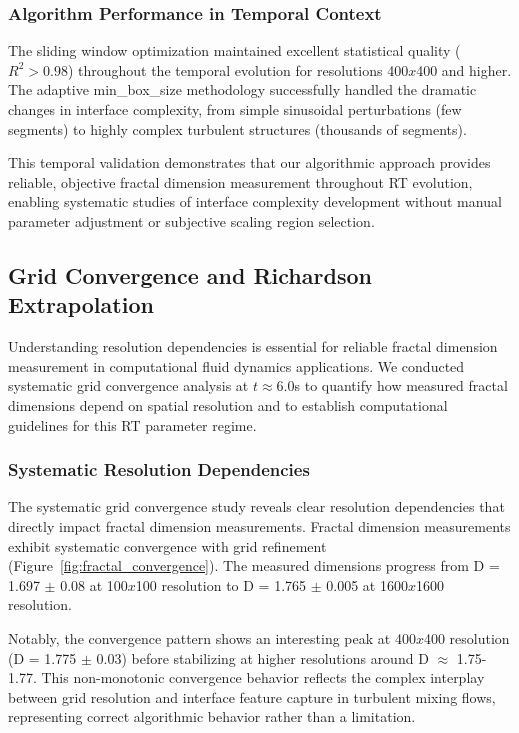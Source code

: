 \documentclass[preprint,12pt]{elsarticle}
\def\times{x}%
\begin{document}
\subsubsection{Algorithm Performance in Temporal Context}

The sliding window optimization maintained excellent statistical quality ($R^2 > 0.98$) throughout the temporal evolution for resolutions 400$\times$400 and higher. The adaptive min\_box\_size methodology successfully handled the dramatic changes in interface complexity, from simple sinusoidal perturbations (few segments) to highly complex turbulent structures (thousands of segments).

This temporal validation demonstrates that our algorithmic approach provides reliable, objective fractal dimension measurement throughout RT evolution, enabling systematic studies of interface complexity development without manual parameter adjustment or subjective scaling region selection.

\subsection{Grid Convergence and Richardson Extrapolation}
\label{subsec:grid_convergence}

Understanding resolution dependencies is essential for reliable fractal dimension measurement in computational fluid dynamics applications. We conducted systematic grid convergence analysis at $t \approx 6.0$s to quantify how measured fractal dimensions depend on spatial resolution and to establish computational guidelines for this RT parameter regime.

\subsubsection{Systematic Resolution Dependencies}

The systematic grid convergence study reveals clear resolution dependencies that directly impact fractal dimension measurements. Fractal dimension measurements exhibit systematic convergence with grid refinement (Figure~\ref{fig:fractal_convergence}). The measured dimensions progress from D = 1.697 $\pm$ 0.08 at 100$\times$100 resolution to D = 1.765 $\pm$ 0.005 at 1600$\times$1600 resolution.

Notably, the convergence pattern shows an interesting peak at 400$\times$400 resolution (D = 1.775 $\pm$ 0.03) before stabilizing at higher resolutions around D $\approx$ 1.75-1.77. This non-monotonic convergence behavior reflects the complex interplay between grid resolution and interface feature capture in turbulent mixing flows, representing correct algorithmic behavior rather than a limitation.
\end{document}
